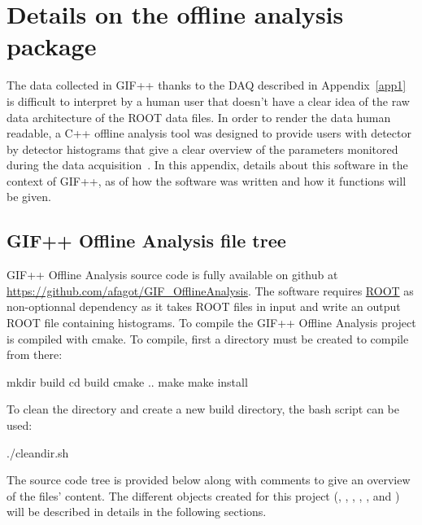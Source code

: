 \renewcommand\evenpagerightmark{{\scshape\small Appendix B}}
\renewcommand\oddpageleftmark{{\scshape\small Details on the online analysis package}}

\renewcommand{\bibname}{References}

\hyphenation{}

\chapter[Details on the offline analysis package]%
{Details on the offline analysis package}
\label{app2}

The data collected in GIF++ thanks to the DAQ described in Appendix~\ref{app1} is difficult to interpret by a human user that doesn't have a clear idea of the raw data architecture of the ROOT data files. In order to render the data human readable, a C++ offline analysis tool was designed to provide users with detector by detector histograms that give a clear overview of the parameters monitored during the data acquisition~\cite{GIFOffline}. In this appendix, details about this software in the context of GIF++, as of how the software was written and how it functions will be given.

\section{GIF++ Offline Analysis file tree}
\label{app2:sec:code}

	GIF++ Offline Analysis source code is fully available on github at \url{https://github.com/afagot/GIF_OfflineAnalysis}. The software requires \href{https://root.cern.ch/downloading-root}{ROOT} as non-optionnal dependency as it takes ROOT files in input and write an output ROOT file containing histograms. To compile the GIF++ Offline Analysis project is compiled with cmake. To compile, first a  directory must be created to compile from there:\\

	\begin{bashcode}
 mkdir build
 cd build
 cmake ..
 make
 make install
	\end{bashcode}
\vspace{5mm}
	To clean the directory and create a new build directory, the bash script  can be used:\\
	
	\begin{bashcode}
 ./cleandir.sh
	\end{bashcode}
\vspace{5mm}
	The source code tree is provided below along with comments to give an overview of the files' content. The different objects created for this project (, , , , ,  and ) will be described in details in the following sections.\\

